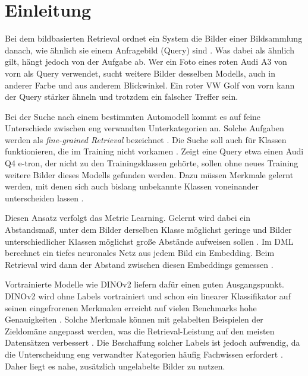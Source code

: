 \chapter{Einleitung}
\label{chap:einleitung}

Bei dem bildbasierten Retrieval ordnet ein System die Bilder einer Bildsammlung danach, wie ähnlich sie einem Anfragebild (Query) sind \cite{musgrave_metric_2020}. Was dabei als ähnlich gilt, hängt jedoch von der Aufgabe ab. Wer ein Foto eines roten Audi A3 von vorn als Query verwendet, sucht weitere Bilder desselben Modells, auch in anderer Farbe und aus anderem Blickwinkel. Ein roter VW Golf von vorn kann der Query stärker ähneln und trotzdem ein falscher Treffer sein.

Bei der Suche nach einem bestimmten Automodell kommt es auf feine Unterschiede zwischen eng verwandten Unterkategorien an. Solche Aufgaben werden als \emph{fine-grained Retrieval} bezeichnet \cite{wei_fine-grained_2021}. Die Suche soll auch für Klassen funktionieren, die im Training nicht vorkamen \cite{song_deep_2016}. Zeigt eine Query etwa einen Audi Q4 e-tron, der nicht zu den Trainingsklassen gehörte, sollen ohne neues Training weitere Bilder dieses Modells gefunden werden. Dazu müssen Merkmale gelernt werden, mit denen sich auch bislang unbekannte Klassen voneinander unterscheiden lassen \cite{song_deep_2016, musgrave_metric_2020}.

Diesen Ansatz verfolgt das Metric Learning. Gelernt wird dabei ein Abstandsmaß, unter dem Bilder derselben Klasse möglichst geringe und Bilder unterschiedlicher Klassen möglichst große Abstände aufweisen sollen \cite{bellet_survey_2014}. Im \ac{DML} berechnet ein tiefes neuronales Netz aus jedem Bild ein Embedding. Beim Retrieval wird dann der Abstand zwischen diesen Embeddings gemessen \cite{musgrave_metric_2020, mohan_deep_2023}. 

Vortrainierte Modelle wie DINOv2 liefern dafür einen guten Ausgangspunkt. DINOv2 wird ohne Labels vortrainiert und schon ein linearer Klassifikator auf seinen eingefrorenen Merkmalen erreicht auf vielen Benchmarks hohe Genauigkeiten \cite{oquab_dinov2_2023}. Solche Merkmale können mit gelabelten Beispielen der Zieldomäne angepasst werden, was die Retrieval-Leistung auf den meisten Datensätzen verbessert \cite{berton_all_2025}. Die Beschaffung solcher Labels ist jedoch aufwendig, da die Unterscheidung eng verwandter Kategorien häufig Fachwissen erfordert \cite{wei_fine-grained_2021}. Daher liegt es nahe, zusätzlich ungelabelte Bilder zu nutzen.


